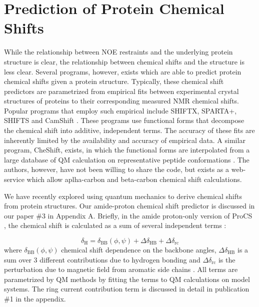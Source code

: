 \chapter{Prediction of Protein Chemical Shifts}

While the relationship between NOE restraints and the underlying protein structure is clear,
the relationship between chemical shifts and the structure is less clear.
Several programs, however, exists which are able to predict protein chemical shifts given a protein structure.
Typically, these chemical shift predictors are parametrized from empirical fits between experimental crystal structures of proteins to their corresponding measured NMR chemical shifts.
Popular programs that employ such empirical include SHIFTX, SPARTA+, SHIFTS and CamShift \cite{SHIFTX,SPARTAPLUS,Osapay1991,CamShift}.
These programs use functional forms that decompose the chemical shift into additive, independent terms.
The accuracy of these fits are inherently limited by the availability and accuracy of empirical data.
A similar program, CheShift, exists, in which the functional forms are interpolated from a large database of QM calculation on representative peptide conformations \cite{CheShift2}.
The authors, however, have not been willing to share the code, but exists as a web-service which allow aplha-carbon and beta-carbon chemical shift calculations.

We have recently explored using quantum mechanics to derive chemical shifts from protein structures. Our amide-proton chemical shift predictor is discussed in our paper \#3 in Appendix A.
Briefly, in the amide proton-only version of ProCS \cite{ProCS}, the chemical shift is calculated as a sum of several independent terms \cite{Parker}:

\begin{equation}
    \delta_\mathrm{H} = \delta_\mathrm{BB}(\phi,\psi) + \Delta\delta_\mathrm{HB} + \Delta\delta_\mathrm{rc}
\end{equation}
where $\delta_\mathrm{BB}(\phi,\psi)$ chemical shift dependence on the backbone angles, $\Delta\delta_\mathrm{HB}$ is a sum over 3 different contributions due to hydrogen bonding and $\Delta\delta_\mathrm{rc}$ is the perturbation due to magnetic field from aromatic side chains \cite{Christensen2011}.
All terms are parametrized by QM methods by fitting the terms to QM calculations on model systems.
The ring current contribution term is discussed in detail in publication \#1 in the appendix.

